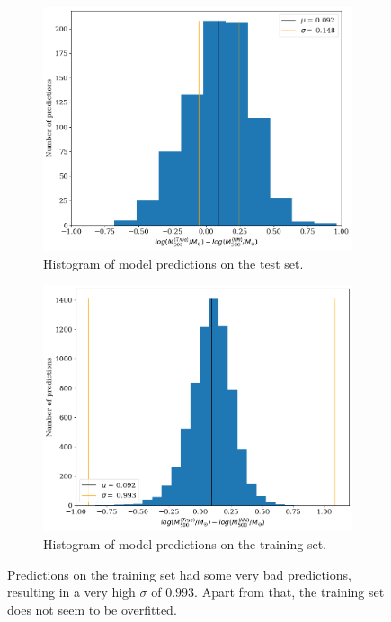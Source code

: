 \begin{figure}[H]
\begin{subfigure}{.46\textwidth}
  \centering
  \includegraphics[width=\linewidth]{images/Chapter4/Res101V2/res101v2_test_hist.png}
  \caption{Histogram of model predictions on the test set.}
  \label{fig:best_perf_resnet101v2_c}
\end{subfigure}%
\hspace{.6em}
\begin{subfigure}{.46\textwidth}
  \centering
  \includegraphics[width=\linewidth]{images/Chapter4/Res101V2/res101v2_training_hist.png}
  \caption{Histogram of model predictions on the training set.}
  \label{fig:best_perf_resnet101v2_d}
\end{subfigure}
\caption{Predictions on the training set had some very bad predictions, resulting in a very high $\sigma$ of $0.993$. Apart from that, the training set does not seem to be overfitted.} 
\label{fig:best_perf_resnet101v2}
\end{figure}


